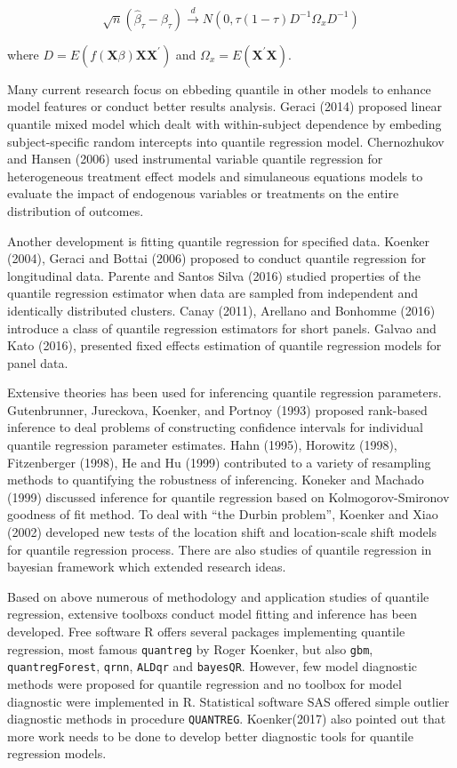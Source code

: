 \documentclass[11pt,a4paper,]{article}
\theoremstyle{definition}
\theoremstyle{definition}
\theoremstyle{remark}
\begin{document}
\begin{equation}
\sqrt{n}(\hat{\beta}_{\tau}-\beta_{\tau}) \xrightarrow{d}
N(0,\tau(1-\tau)D^{-1}\varOmega_{x}D^{-1})
\label{eq:distrbution}
\end{equation}

where \(D=E(f(\textbf{X}\beta)\textbf{X}\textbf{X}^{'})\) and
\(\varOmega_{x}=E(\textbf{X}^{'}\textbf{X})\).

Many current research focus on ebbeding quantile in other models to
enhance model features or conduct better results analysis. Geraci (2014)
proposed linear quantile mixed model which dealt with within-subject
dependence by embeding subject-specific random intercepts into quantile
regression model. Chernozhukov and Hansen (2006) used instrumental
variable quantile regression for heterogeneous treatment effect models
and simulaneous equations models to evaluate the impact of endogenous
variables or treatments on the entire distribution of outcomes.

Another development is fitting quantile regression for specified data.
Koenker (2004), Geraci and Bottai (2006) proposed to conduct quantile
regression for longitudinal data. Parente and Santos Silva (2016)
studied properties of the quantile regression estimator when data are
sampled from independent and identically distributed clusters. Canay
(2011), Arellano and Bonhomme (2016) introduce a class of quantile
regression estimators for short panels. Galvao and Kato (2016),
presented fixed effects estimation of quantile regression models for
panel data.

Extensive theories has been used for inferencing quantile regression
parameters. Gutenbrunner, Jureckova, Koenker, and Portnoy (1993)
proposed rank-based inference to deal problems of constructing
confidence intervals for individual quantile regression parameter
estimates. Hahn (1995), Horowitz (1998), Fitzenberger (1998), He and Hu
(1999) contributed to a variety of resampling methods to quantifying the
robustness of inferencing. Koneker and Machado (1999) discussed
inference for quantile regression based on Kolmogorov-Smironov goodness
of fit method. To deal with ``the Durbin problem'', Koenker and Xiao
(2002) developed new tests of the location shift and location-scale
shift models for quantile regression process. There are also studies of
quantile regression in bayesian framework which extended research ideas.

Based on above numerous of methodology and application studies of
quantile regression, extensive toolboxs conduct model fitting and
inference has been developed. Free software R offers several packages
implementing quantile regression, most famous \texttt{quantreg} by Roger
Koenker, but also \texttt{gbm}, \texttt{quantregForest}, \texttt{qrnn},
\texttt{ALDqr} and \texttt{bayesQR}. However, few model diagnostic
methods were proposed for quantile regression and no toolbox for model
diagnostic were implemented in R. Statistical software SAS offered
simple outlier diagnostic methods in procedure \texttt{QUANTREG}.
Koenker(2017) also pointed out that more work needs to be done to
develop better diagnostic tools for quantile regression models.
\end{document}
